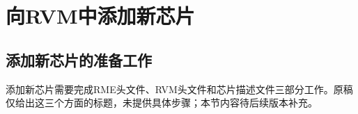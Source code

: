\chapter{向RVM中添加新芯片}\label{ch:7-adding-a-new-chip}
\section{添加新芯片的准备工作}\label{sec:7-1}

添加新芯片需要完成RME头文件、RVM头文件和芯片描述文件三部分工作。原稿仅给出这三个方面的标题，未提供具体步骤；本节内容待后续版本补充。

